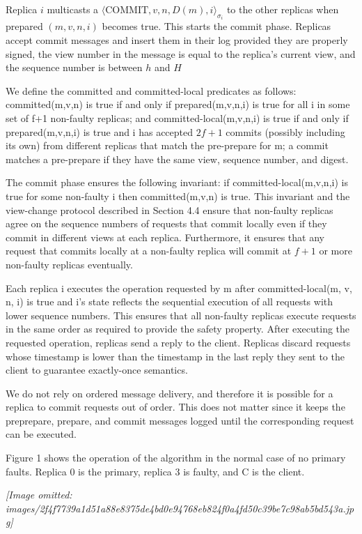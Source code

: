 \documentclass[
]{article}
\begin{document}
Replica \(i\) multicasts a
\(\langle \text{COMMIT}, v, n, D(m), i \rangle_{\sigma_i}\) to the other
replicas when prepared \((m, v, n, i)\) becomes true. This starts the
commit phase. Replicas accept commit messages and insert them in their
log provided they are properly signed, the view number in the message is
equal to the replica's current view, and the sequence number is between
\(h\) and \(H\)

We define the committed and committed-local predicates as follows:
committed(m,v,n) is true if and only if prepared(m,v,n,i) is true for
all i in some set of f+1 non-faulty replicas; and
committed-local(m,v,n,i) is true if and only if prepared(m,v,n,i) is
true and i has accepted \(2f+1\) commits (possibly including its own)
from different replicas that match the pre-prepare for m; a commit
matches a pre-prepare if they have the same view, sequence number, and
digest.

The commit phase ensures the following invariant: if
committed-local(m,v,n,i) is true for some non-faulty i then
committed(m,v,n) is true. This invariant and the view-change protocol
described in Section 4.4 ensure that non-faulty replicas agree on the
sequence numbers of requests that commit locally even if they commit in
different views at each replica. Furthermore, it ensures that any
request that commits locally at a non-faulty replica will commit at
\(f + 1\) or more non-faulty replicas eventually.

Each replica i executes the operation requested by m after
committed-local(m, v, n, i) is true and i's state reflects the
sequential execution of all requests with lower sequence numbers. This
ensures that all non-faulty replicas execute requests in the same order
as required to provide the safety property. After executing the
requested operation, replicas send a reply to the client. Replicas
discard requests whose timestamp is lower than the timestamp in the last
reply they sent to the client to guarantee exactly-once semantics.

We do not rely on ordered message delivery, and therefore it is possible
for a replica to commit requests out of order. This does not matter
since it keeps the preprepare, prepare, and commit messages logged until
the corresponding request can be executed.

Figure 1 shows the operation of the algorithm in the normal case of no
primary faults. Replica 0 is the primary, replica 3 is faulty, and C is
the client.

\textit{[Image omitted: images/2f4f7739a1d51a88e8375de4bd0e94768eb824f0a4fd50c39be7c98ab5bd543a.jpg]}
\end{document}
